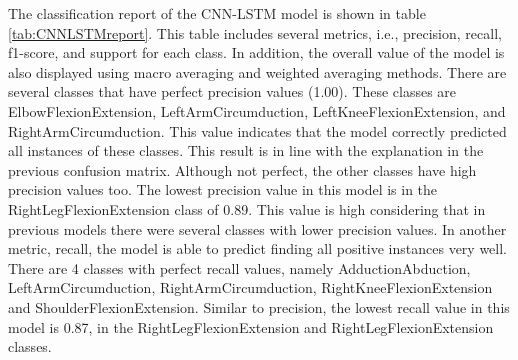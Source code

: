 The classification report of the CNN-LSTM model is shown in table \ref{tab:CNNLSTMreport}. This table includes several metrics, i.e., precision, recall, f1-score, and support for each class. In addition, the overall value of the model is also displayed using macro averaging and weighted averaging methods. There are several classes that have perfect precision values (1.00). These classes are ElbowFlexionExtension, LeftArmCircumduction, LeftKneeFlexionExtension, and RightArmCircumduction. This value indicates that the model correctly predicted all instances of these classes. This result is in line with the explanation in the previous confusion matrix. Although not perfect, the other classes have high precision values too. The lowest precision value in this model is in the RightLegFlexionExtension class of 0.89. This value is high considering that in previous models there were several classes with lower precision values. In another metric, recall, the model is able to predict finding all positive instances very well. There are 4 classes with perfect recall values, namely AdductionAbduction, LeftArmCircumduction, RightArmCircumduction, RightKneeFlexionExtension and ShoulderFlexionExtension. Similar to precision, the lowest recall value in this model is 0.87, in the RightLegFlexionExtension and RightLegFlexionExtension classes.

